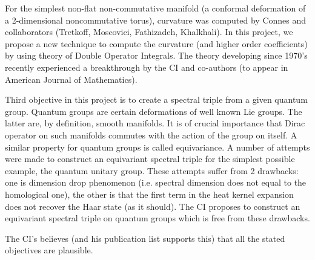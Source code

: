 \documentclass[12pt]{article}
\begin{document}
For the simplest non-flat non-commutative manifold (a conformal deformation of a 2-dimensional noncommutative torus), curvature was computed by Connes and collaborators (Tretkoff, Moscovici, Fathizadeh, Khalkhali). In this project, we propose a new technique to compute the curvature (and higher order coefficients) by using theory of Double Operator Integrals. The theory developing since 1970's recently experienced a breakthrough by the CI and co-authors (to appear in American Journal of Mathematics).

Third objective in this project is to create a spectral triple from a given quantum group. Quantum groups are certain deformations of well known Lie groups. The latter are, by definition, smooth manifolds. It is of crucial importance that Dirac operator on such manifolds commutes with the action of the group on itself. A similar property for quantum groups is called equivariance. A number of attempts were made to construct an equivariant spectral triple for the simplest possible example, the quantum unitary group. These attempts suffer from 2 drawbacks: one is dimension drop phenomenon (i.e. spectral dimension does not equal to the homological one), the other is that the first term in the heat kernel expansion does not recover the Haar state (as it should). The CI proposes to construct an equivariant spectral triple on quantum groups which is free from these drawbacks.

The CI's believes (and his publication list supports this) that all the stated objectives are plausible.
\end{document}
